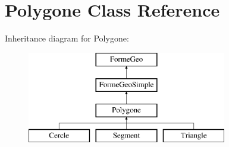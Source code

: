 \hypertarget{class_polygone}{}\section{Polygone Class Reference}
\label{class_polygone}
Inheritance diagram for Polygone\+:\begin{figure}[H]
\begin{center}
\leavevmode
\includegraphics[height=4.000000cm]{d2/de4/class_polygone}
\end{center}
\end{figure}
